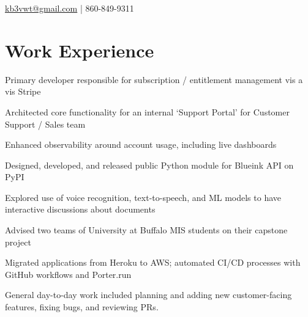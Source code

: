\documentclass[]{resume-template}
\begin{document}
\href{mailto:kb3vwt@gmail.com}{kb3vwt@gmail.com} | 860-849-9311
\noindent\makebox[\linewidth]{\rule{\paperwidth}{0.4pt}}




\section{Work Experience}
\vspace{1ex} %
\begin{tightemize}
\item Primary developer responsible for subscription / entitlement management vis a vis Stripe
\item Architected core functionality for an internal `Support Portal' for Customer Support / Sales team
\item Enhanced observability around account usage, including live dashboards
\item Designed, developed, and released public Python module for Blueink API on PyPI
\item Explored use of voice recognition, text-to-speech, and ML models to have interactive discussions about documents 
\item Advised two teams of University at Buffalo MIS students on their capstone project
\item Migrated applications from Heroku to AWS; automated CI/CD processes with GitHub workflows and Porter.run
\item General day-to-day work included planning and adding new customer-facing features, fixing bugs, and reviewing PRs. 
\end{tightemize}
\sectionsep
\end{document}
